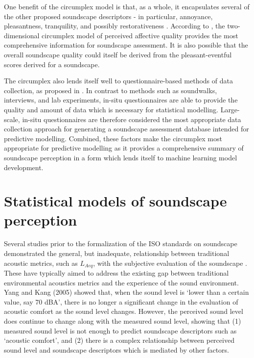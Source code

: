 One benefit of the circumplex model is that, as a whole, it encapsulates several of the other proposed soundscape descriptors - in particular, annoyance, pleasantness, tranquility, and possibly restorativeness \citep{Aletta2016Soundscape}. According to \citet{Axelsson2015How}, the two-dimensional circumplex model of perceived affective quality provides the most comprehensive information for soundscape assessment. It is also possible that the overall soundscape quality could itself be derived from the pleasant-eventful scores derived for a soundscape.

The circumplex also lends itself well to questionnaire-based methods of data collection, as proposed in \citet{ISO12913Part2}. In contrast to methods such as soundwalks, interviews, and lab experiments, in-situ questionnaires are able to provide the quality and amount of data which is necessary for statistical modelling. Large-scale, in-situ questionnaires are therefore considered the most appropriate data collection approach for generating a soundscape assessment database intended for predictive modelling. Combined, these factors make the circumplex most appropriate for predictive modelling as it provides a comprehensive summary of soundscape perception in a form which lends itself to machine learning model development.

\section{Statistical models of soundscape perception}
Several studies prior to the formalization of the ISO standards on soundscape demonstrated the general, but inadequate, relationship between traditional acoustic metrics, such as $L_{Aeq}$, with the subjective evaluation of the soundscape \citep{Berglund2006Tool,Yang2005Acoustic,Rychtarikova2013Soundscape,Aumond2017Modeling,AlsinaPages2021Perceptual}. These have typically aimed to address the existing gap between traditional environmental acoustics metrics and the experience of the sound environment. Yang and Kang (2005) showed that, when the sound level is `lower than a certain value, say 70 dBA', there is no longer a significant change in the evaluation of acoustic comfort as the sound level changes. However, the perceived sound level does continue to change along with the measured sound level, showing that (1) measured sound level is not enough to predict soundscape descriptors such as `acoustic comfort', and (2) there is a complex relationship between perceived sound level and soundscape descriptors which is mediated by other factors.

